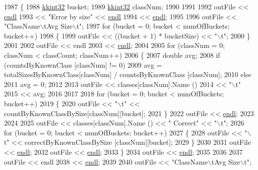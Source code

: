 \begin{DoxyCode}
1987 \{
1988   \hyperlink{namespace_k_k_b_a8fa4952cc84fda1de4bec1fbdd8d5b1b}{kkint32}  bucket;
1989   \hyperlink{namespace_k_k_b_a8fa4952cc84fda1de4bec1fbdd8d5b1b}{kkint32}  classNum;
1990 
1991 
1992   outFile  << \hyperlink{namespace_k_k_b_ad1f50f65af6adc8fa9e6f62d007818a8}{endl}
1993            << \textcolor{stringliteral}{"Error by size"} << \hyperlink{namespace_k_k_b_ad1f50f65af6adc8fa9e6f62d007818a8}{endl}
1994            << \hyperlink{namespace_k_k_b_ad1f50f65af6adc8fa9e6f62d007818a8}{endl};
1995 
1996   outFile  << \textcolor{stringliteral}{"ClassName\(\backslash\)tAvg Size\(\backslash\)t"};
1997   \textcolor{keywordflow}{for}  (bucket = 0; bucket < numOfBuckets; bucket++)
1998   \{
1999     outFile << ((bucket + 1) * bucketSize) << \textcolor{stringliteral}{"\(\backslash\)t"};
2000   \}
2001 
2002   outFile << endl
2003           << \hyperlink{namespace_k_k_b_ad1f50f65af6adc8fa9e6f62d007818a8}{endl};
2004 
2005   \textcolor{keywordflow}{for}  (classNum = 0; classNum < classCount; classNum++)
2006   \{
2007     \textcolor{keywordtype}{double}  avg;
2008     \textcolor{keywordflow}{if}  (countsByKnownClass [classNum] != 0)
2009       avg = totalSizesByKnownClass[classNum] / countsByKnownClass [classNum];
2010     \textcolor{keywordflow}{else}
2011       avg = 0;
2012 
2013     outFile << classes[classNum].Name ()
2014             << \textcolor{stringliteral}{"\(\backslash\)t"}
2015             <<  avg;
2016 
2017 
2018     \textcolor{keywordflow}{for}  (bucket = 0; bucket < numOfBuckets; bucket++)
2019     \{
2020       outFile << \textcolor{stringliteral}{"\(\backslash\)t"} << countByKnownClassBySize[classNum][bucket];
2021     \}
2022     outFile << \hyperlink{namespace_k_k_b_ad1f50f65af6adc8fa9e6f62d007818a8}{endl};
2023 
2024     
2025     outFile << classes[classNum].Name () << \textcolor{stringliteral}{" Correct"} << \textcolor{stringliteral}{"\(\backslash\)t"};
2026     \textcolor{keywordflow}{for}  (bucket = 0; bucket < numOfBuckets; bucket++)
2027     \{
2028       outFile << \textcolor{stringliteral}{"\(\backslash\)t"} << correctByKnownClassBySize [classNum][bucket];
2029     \}
2030 
2031     outFile << \hyperlink{namespace_k_k_b_ad1f50f65af6adc8fa9e6f62d007818a8}{endl};
2032     outFile << \hyperlink{namespace_k_k_b_ad1f50f65af6adc8fa9e6f62d007818a8}{endl};
2033   \}
2034   outFile << \hyperlink{namespace_k_k_b_ad1f50f65af6adc8fa9e6f62d007818a8}{endl};
2035 
2036 
2037   outFile << endl
2038           << \hyperlink{namespace_k_k_b_ad1f50f65af6adc8fa9e6f62d007818a8}{endl};
2039 
2040   outFile  << \textcolor{stringliteral}{"ClassName\(\backslash\)tAvg Size\(\backslash\)t"};

\end{DoxyCode}
